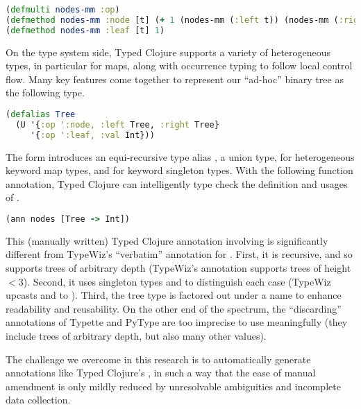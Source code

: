 \begin{lstlisting}[language=Clojure]
(defmulti nodes-mm :op)
(defmethod nodes-mm :node [t] (+ 1 (nodes-mm (:left t)) (nodes-mm (:right t))))
(defmethod nodes-mm :leaf [t] 1)
\end{lstlisting}

On the type system side, Typed Clojure supports a variety of heterogeneous types,
in particular for maps, along with occurrence typing \cite{TF10} to follow local control flow.
Many key features come together to represent our ``ad-hoc'' binary tree as the following type.

\begin{lstlisting}[language=Clojure]
(defalias Tree
  (U '{:op ':node, :left Tree, :right Tree}
     '{:op ':leaf, :val Int}))
\end{lstlisting}

The  form introduces an equi-recursive type alias ,
 a union type,  for heterogeneous keyword map types,
and  for keyword singleton types.
With the following function annotation, Typed Clojure can intelligently type check
the definition and usages of .

\begin{lstlisting}[language=Clojure]
(ann nodes [Tree -> Int])
\end{lstlisting}

This (manually written) Typed Clojure annotation involving 
is significantly different from TypeWiz's ``verbatim'' annotation for .
First, it is recursive, and so supports trees of arbitrary depth (TypeWiz's annotation
supports trees of height $<3$).
Second, it uses singleton types  and  to distinguish each case
(TypeWiz upcasts  and  to ).
Third, the tree type is factored out under a name to enhance readability and reusability.
On the other end of the spectrum, the ``discarding'' annotations of Typette and PyType
are too imprecise to use meaningfully (they include trees of arbitrary depth, but
also many other values).

The challenge we overcome in this research is to automatically generate
annotations like Typed Clojure's , in such a way that the ease of manual amendment is
only mildly reduced by unresolvable ambiguities and incomplete data collection.


